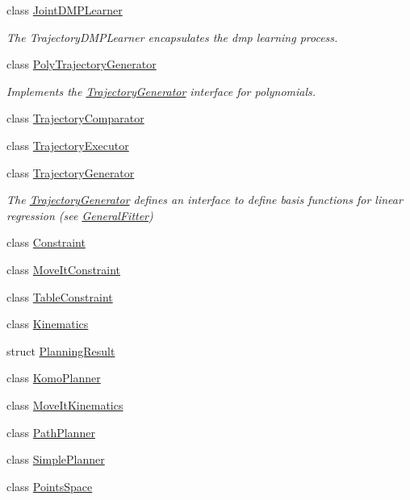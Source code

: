 \begin{DoxyCompactItemize}
class \hyperlink{classkukadu_1_1JointDMPLearner}{Joint\-D\-M\-P\-Learner}
\begin{DoxyCompactList}\small\item\em The Trajectory\-D\-M\-P\-Learner encapsulates the dmp learning process. \end{DoxyCompactList}\item 
class \hyperlink{classkukadu_1_1PolyTrajectoryGenerator}{Poly\-Trajectory\-Generator}
\begin{DoxyCompactList}\small\item\em Implements the \hyperlink{classkukadu_1_1TrajectoryGenerator}{Trajectory\-Generator} interface for polynomials. \end{DoxyCompactList}\item 
class \hyperlink{classkukadu_1_1TrajectoryComparator}{Trajectory\-Comparator}
\item 
class \hyperlink{classkukadu_1_1TrajectoryExecutor}{Trajectory\-Executor}
\item 
class \hyperlink{classkukadu_1_1TrajectoryGenerator}{Trajectory\-Generator}
\begin{DoxyCompactList}\small\item\em The \hyperlink{classkukadu_1_1TrajectoryGenerator}{Trajectory\-Generator} defines an interface to define basis functions for linear regression (see \hyperlink{classkukadu_1_1GeneralFitter}{General\-Fitter}) \end{DoxyCompactList}\item 
class \hyperlink{classkukadu_1_1Constraint}{Constraint}
\item 
class \hyperlink{classkukadu_1_1MoveItConstraint}{Move\-It\-Constraint}
\item 
class \hyperlink{classkukadu_1_1TableConstraint}{Table\-Constraint}
\item 
class \hyperlink{classkukadu_1_1Kinematics}{Kinematics}
\item 
struct \hyperlink{structkukadu_1_1PlanningResult}{Planning\-Result}
\item 
class \hyperlink{classkukadu_1_1KomoPlanner}{Komo\-Planner}
\item 
class \hyperlink{classkukadu_1_1MoveItKinematics}{Move\-It\-Kinematics}
\item 
class \hyperlink{classkukadu_1_1PathPlanner}{Path\-Planner}
\item 
class \hyperlink{classkukadu_1_1SimplePlanner}{Simple\-Planner}
\item 
class \hyperlink{classkukadu_1_1PointsSpace}{Points\-Space}

\end{DoxyCompactItemize}
